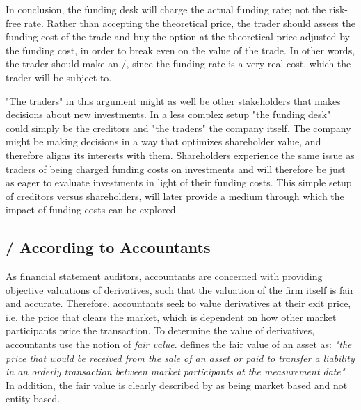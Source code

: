 \documentclass[main.tex]{subfiles}
\begin{document}
            In conclusion, the funding desk will charge the actual funding rate; not the risk-free rate.
            Rather than accepting the theoretical price, the trader should assess the funding cost of the trade 
            and buy the option at the theoretical price adjusted by the funding cost,
            in order to break even on the value of the trade.
            In other words, the trader should make an \FVA/, 
            since the funding rate is a very real cost, which the trader will be subject to.
            
            "The traders" in this argument might as well be other stakeholders that makes decisions about new investments.
            In a less complex setup "the funding desk" could simply be the creditors and "the traders" the company itself.
            The company might be making decisions in a way that optimizes shareholder value,
            and therefore aligns its interests with them.
            Shareholders experience the same issue as traders of being charged funding costs on investments 
            and will therefore be just as eager to evaluate investments in light of their funding costs.
            This simple setup of creditors versus shareholders, 
            will later provide a medium through which the impact of funding costs can be explored.

        \subsection{\FVA/ According to Accountants}
            As financial statement auditors, accountants are concerned with providing objective valuations of derivatives,
            such that the valuation of the firm itself is fair and accurate.
            Therefore, accountants seek to value derivatives at their exit price, i.e. the price that clears the market,
            which is dependent on how other market participants price the transaction.
            To determine the value of derivatives, accountants use the notion of \textit{fair value}.
            \textcite{IFRS13} defines the fair value of an asset as: 
            \textit{"the price that would be received from the sale of an asset or paid to transfer a liability
            in an orderly transaction between market participants at the measurement date"}.
            In addition, the fair value is clearly described by \textcite{IFRS13} as being market based and not entity based.
\end{document}
